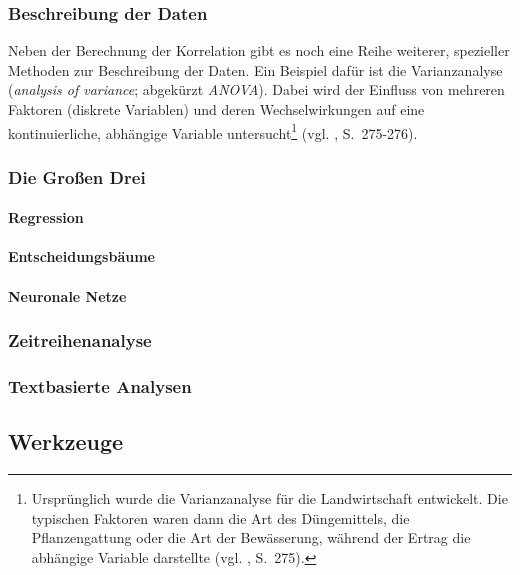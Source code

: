 % 
\subsubsection{Beschreibung der Daten}


Neben der Berechnung der Korrelation gibt es noch eine Reihe weiterer, spezieller
Methoden zur Beschreibung der Daten. Ein Beispiel dafür ist die Varianzanalyse
(\emph{analysis of variance}; abgekürzt \emph{ANOVA}). Dabei wird der Einfluss
von mehreren Faktoren (diskrete Variablen) und deren Wechselwirkungen auf eine
kontinuierliche, abhängige Variable untersucht\footnote{
Ursprünglich wurde die Varianzanalyse für die Landwirtschaft entwickelt. Die
typischen Faktoren waren dann die Art des Düngemittels, die Pflanzengattung oder
die Art der Bewässerung, während der Ertrag die abhängige Variable darstellte
(vgl. \cite{Bijma}, S.~275).
} (vgl. \cite{Bijma}, S.~275-276).

\subsubsection{Die Großen Drei}

\paragraph{Regression}

\paragraph{Entscheidungsbäume}

\paragraph{Neuronale Netze}

\subsubsection{Zeitreihenanalyse}

\subsubsection{Textbasierte Analysen}

\subsection{Werkzeuge}

